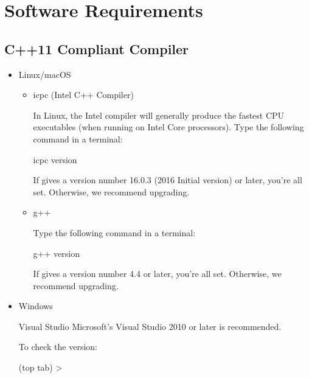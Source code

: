 \documentclass[letterpaper,10pt,english]{sphinxmanual}
\begin{document}
\chapter{Software Requirements}
\label{\detokenize{software_requirements:software-requirements}}\label{\detokenize{software_requirements::doc}}

\section{C++11 Compliant Compiler}
\label{\detokenize{software_requirements:c-11-compliant-compiler}}\begin{itemize}
\item {} 
Linux/macOS
\begin{itemize}
\item {} 
icpc (Intel C++ Compiler)

In Linux, the Intel compiler will generally produce the fastest CPU executables (when running on Intel Core processors). Type the following command in a terminal:

\begin{sphinxVerbatim}[commandchars=\\\{\}]
\PYGZdl{} icpc \PYGZhy{}\PYGZhy{}version
\end{sphinxVerbatim}

If gives a version number 16.0.3 (2016 Initial version) or later, you’re all set. Otherwise, we recommend upgrading.

\item {} 
g++

Type the following command in a terminal:

\begin{sphinxVerbatim}[commandchars=\\\{\}]
\PYGZdl{} g++ \PYGZhy{}\PYGZhy{}version
\end{sphinxVerbatim}

If gives a version number 4.4 or later, you’re all set. Otherwise, we recommend upgrading.

\end{itemize}

\item {} 
Windows

Visual Studio Microsoft’s Visual Studio 2010 or later is recommended.

To check the version:

 (top tab) \sphinxhyphen{}\textgreater{} 

\noindent{}

\noindent{}

\end{itemize}
\end{document}
